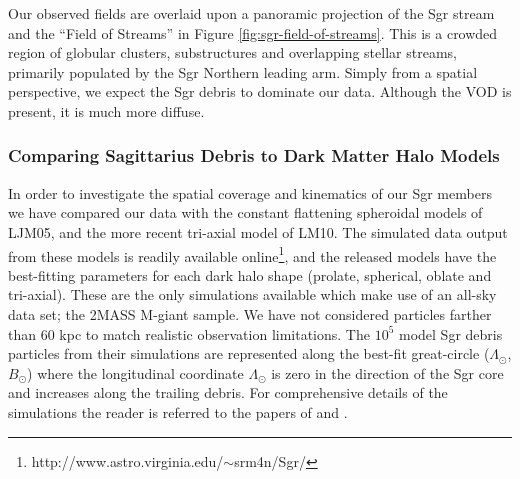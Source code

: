 \documentclass[preprint2]{aastex}
\begin{document}
	  Our observed fields are overlaid upon a panoramic projection of the Sgr stream and the  ``Field of Streams''  \citep{Belokurov;et-al_2006} in Figure \ref{fig:sgr-field-of-streams}. This is a crowded region of globular clusters, substructures and overlapping stellar streams, primarily populated by the Sgr Northern leading arm. Simply from a spatial perspective, we expect the Sgr debris to dominate our data. Although the VOD is present, it is much more diffuse. 
	
	\subsubsection{Comparing Sagittarius Debris to Dark Matter Halo Models}	

	In order to investigate the spatial coverage and kinematics of our Sgr members we have compared our data with the constant flattening spheroidal models of LJM05, and the more recent tri-axial model of LM10. The simulated data output from these models is readily available online\footnote{http://www.astro.virginia.edu/$\sim$srm4n/Sgr/}, and the released models have the best-fitting parameters for each dark halo shape (prolate, spherical, oblate and tri-axial).  These are the only simulations available which make use of an all-sky data set; the 2MASS M-giant sample. We have not considered particles farther than 60 kpc to match realistic observation limitations.  The $10^5$ model Sgr debris particles from their simulations are represented along the best-fit great-circle ($\Lambda_\odot$, $B_\odot$) where the longitudinal coordinate $\Lambda_\odot$ is zero in the direction of the Sgr core and increases along the trailing debris. For comprehensive details of the simulations the reader is referred to the papers of \citet{Law;et-al_2005} and \citet{Law;Majewski_2010}. 
		
\end{document}

